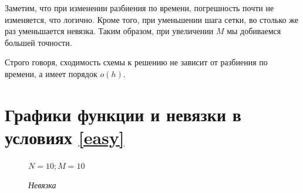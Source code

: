 \documentclass[12pt]{extarticle}
\numberwithin{equation}{section}
\begin{document}
Заметим, что при изменении разбиения по времени, погрешность почти не изменяется, что логично.
Кроме того, при уменьшении шага сетки, во столько же раз уменьшается невязка.
Таким образом, при увеличении $M$ мы добиваемся большей точности. 

Строго говоря, сходимость схемы к решению не зависит от разбиения по времени, а имеет порядок  $o(h)$.



\newpage
\section{Графики функции и невязки в условиях \ref{easy}}
\appendix \label{grap1}
\begin{figure}[H]
\begin{minipage}[h]{0.43\linewidth}
 $N=10; M=10$ \\
\end{minipage}
\hfill
\begin{minipage}[h]{0.43\linewidth}
 \textit{Невязка} \\
\end{minipage}
\end{figure}
\end{document}
